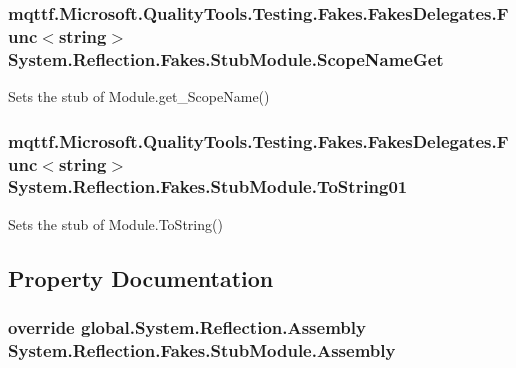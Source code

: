 \hypertarget{class_system_1_1_reflection_1_1_fakes_1_1_stub_module_a2a138245c32068da08d5481efe3f6366}{
\subsubsection[{Scope\-Name\-Get}]{\setlength{\rightskip}{0pt plus 5cm}mqttf.\-Microsoft.\-Quality\-Tools.\-Testing.\-Fakes.\-Fakes\-Delegates.\-Func$<$string$>$ System.\-Reflection.\-Fakes.\-Stub\-Module.\-Scope\-Name\-Get}}\label{class_system_1_1_reflection_1_1_fakes_1_1_stub_module_a2a138245c32068da08d5481efe3f6366}


Sets the stub of Module.\-get\-\_\-\-Scope\-Name()

\hypertarget{class_system_1_1_reflection_1_1_fakes_1_1_stub_module_a76ad7b085ff6976b91407939e4b616e5}{
\subsubsection[{To\-String01}]{\setlength{\rightskip}{0pt plus 5cm}mqttf.\-Microsoft.\-Quality\-Tools.\-Testing.\-Fakes.\-Fakes\-Delegates.\-Func$<$string$>$ System.\-Reflection.\-Fakes.\-Stub\-Module.\-To\-String01}}\label{class_system_1_1_reflection_1_1_fakes_1_1_stub_module_a76ad7b085ff6976b91407939e4b616e5}


Sets the stub of Module.\-To\-String()



\subsection{Property Documentation}
\hypertarget{class_system_1_1_reflection_1_1_fakes_1_1_stub_module_a8c184f7a6b5f5715a03cf5bb59a2ef31}{
\subsubsection[{Assembly}]{\setlength{\rightskip}{0pt plus 5cm}override global.\-System.\-Reflection.\-Assembly System.\-Reflection.\-Fakes.\-Stub\-Module.\-Assembly\hspace{0.3cm}{\ttfamily [get]}}}\label{class_system_1_1_reflection_1_1_fakes_1_1_stub_module_a8c184f7a6b5f5715a03cf5bb59a2ef31}


